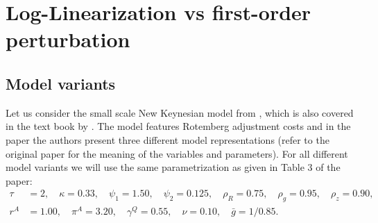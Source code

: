 \section{Log-Linearization vs first-order perturbation\label{ex:LogLinearization}}

\subsection*{Model variants}
Let us consider the small scale New Keynesian model from \textcite{An.Schorfheide_2007_BayesianAnalysisDSGE},
  which is also covered in the text book by \textcite{Herbst.Schorfheide_2016_BayesianEstimationDSGE}.
The model features Rotemberg adjustment costs and in the paper the authors present three different model representations
  (refer to the original paper for the meaning of the variables and parameters).
For all different model variants we will use the same parametrization as given in Table 3 of the paper:
\begin{align*}
\tau&=2, \quad
\kappa=0.33, \quad
\psi_1 = 1.50, \quad
\psi_2  = 0.125, \quad
\rho_R  = 0.75, \quad
\rho_g  = 0.95, \quad
\rho_z  = 0.90,\\
r^A  &= 1.00, \quad
\pi^A = 3.20, \quad
\gamma^Q = 0.55, \quad
\nu = 0.10, \quad
\bar{g} = 1/0.85.
\end{align*}

